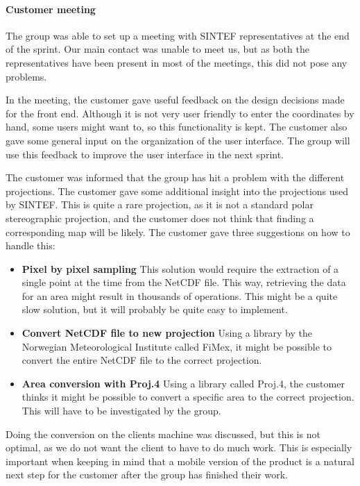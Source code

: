 \documentclass[11pt,a4paper,titlepage,oneside]{report}
\begin{document}
\paragraph{Customer meeting}
The group was able to set up a meeting with SINTEF representatives at the end of the sprint. Our main contact was unable to meet us, but as both the representatives have been present in most of the meetings, this did not pose any problems. 

In the meeting, the customer gave useful feedback on the design decisions made for the front end. Although it is not very user friendly to enter the coordinates by hand, some users might want to, so this functionality is kept. The customer also gave some general input on the organization of the user interface. The group will use this feedback to improve the user interface in the next sprint. 

The customer was informed that the group has hit a problem with the different projections. The customer gave some additional insight into the projections used by SINTEF. This is quite a rare projection, as it is not a standard polar stereographic projection, and the customer does not think that finding a corresponding map will be likely. The customer gave three suggestions on how to handle this:
\begin{itemize}
\item \textbf{Pixel by pixel sampling} This solution would require the extraction of a single point at the time from the NetCDF file. This way, retrieving the data for an area might result in thousands of operations. This might be a quite slow solution, but it will probably be quite easy to implement.
\item \textbf{Convert NetCDF file to new projection} Using a library by the Norwegian Meteorological Institute called FiMex, it might be possible to convert the entire NetCDF file to the correct projection. 
\item \textbf{Area conversion with Proj.4} Using a library called Proj.4, the customer thinks it might be possible to convert a specific area to the correct projection. This will have to be investigated by the group.
\end{itemize}

Doing the conversion on the clients machine was discussed, but this is not optimal, as we do not want the client to have to do much work. This is especially important when keeping in mind that a mobile version of the product is a natural next step for the customer after the group has finished their work.
\end{document}

